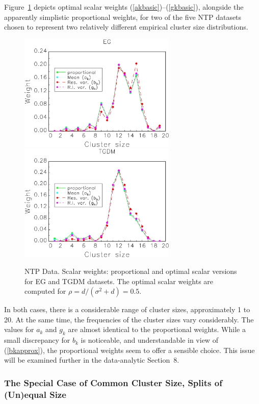 \documentclass[11pt,a5paper,twoside]{book}
\begin{document}
Figure~\ref{ntpweightfigure} depicts optimal scalar weights 
(\ref{akbasic})--(\ref{gkbasic}), alongside the apparently simplistic 
proportional weights, for two of the five NTP datasets 
chosen  to represent two relatively different empirical cluster 
size distributions.
\begin{figure}[t]
\begin{center}
\includegraphics[width=7.5cm]{egclipped.eps}
\includegraphics[width=7.5cm]{tgdmclipped.eps}
\caption{\small \linespread{1.1} NTP Data. Scalar weights: proportional and optimal scalar versions for EG and TGDM datasets. The optimal scalar weights are computed for $\rho=d/(\sigma^2+d)=0.5$.}
\label{ntpweightfigure}
\end{center}
\end{figure}
In both cases, there is a considerable range of cluster sizes, approximately 
1 to 20. At the same time, the frequencies of the cluster sizes vary 
considerably. The values for $a_k$ and $g_k$ are almost identical to 
the proportional weights. While a small discrepancy for $b_k$ is 
noticeable, and understandable in view of (\ref{bkapprox}), the 
proportional weights seem to offer a sensible choice. This issue 
will be examined further in the data-analytic Section~8.

\subsubsection{The Special Case of Common Cluster Size, Splits of (Un)equal Size}
\label{horizontal}
\end{document}
